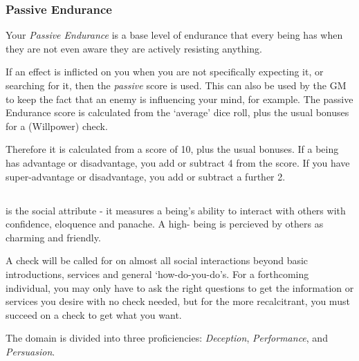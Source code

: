 \subsubsection{Passive Endurance}

Your {\it Passive Endurance} is a base level of endurance that every being has when they are not even aware they are actively resisting anything. 

If an effect is inflicted on you when you are not specifically expecting it, or searching for it, then the {\it passive} score is used. This can also be used by the GM to keep the fact that an enemy is influencing your mind, for example. The passive Endurance score is calculated from the `average' dice roll, plus the usual bonuses for a \attSpr{} (Willpower) check. 

Therefore it is calculated from a score of 10, plus the usual bonuses. If a being has advantage or disadvantage, you add or subtract 4 from the score. If you have super-advantage or disadvantage, you add or subtract a further 2. 


\subsection{\attChr{}}

\attChr{} is the social attribute - it measures a being's ability to interact with others with confidence, eloquence and panache. A high-\attChr{} being is percieved by others as charming and friendly. 

A \attChr{} check will be called for on almost all social interactions beyond basic introductions, services and general `how-do-you-do's. For a forthcoming individual, you may only have to ask the right questions to get the information or services you desire with no check needed, but for the more recalcitrant, you must succeed on a \attChr{} check to get what you want. 

The \attChr{} domain is divided into three proficiencies: {\it Deception}, {\it Performance}, and {\it Persuasion}. 



